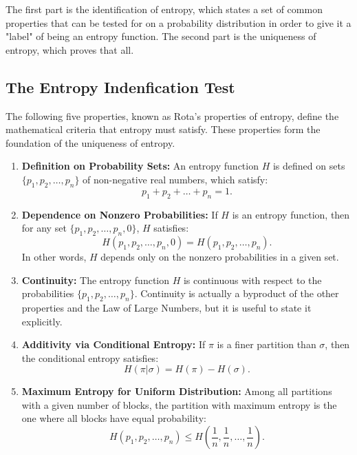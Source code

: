 \documentclass{report}
\begin{document}
The first part is the identification of entropy, which states a set of common properties that can be tested for on a probability distribution in order to give it a "label" of being an entropy function. The second part is the uniqueness of entropy, which proves that all.
\subsection*{The Entropy Indenfication Test}

The following five properties, known as Rota's properties of entropy, define the mathematical criteria that entropy must satisfy. These properties form the foundation of the uniqueness of entropy.

\begin{enumerate}
    \item \textbf{Definition on Probability Sets:}  
    An entropy function \( H \) is defined on sets \( \{p_1, p_2, \ldots, p_n\} \) of non-negative real numbers, which satisfy:
    \[
    p_1 + p_2 + \ldots + p_n = 1.
    \]

    \item \textbf{Dependence on Nonzero Probabilities:}  
    If \( H \) is an entropy function, then for any set \( \{p_1, p_2, \ldots, p_n, 0\} \), \( H \) satisfies:
    \[
    H(p_1, p_2, \ldots, p_n, 0) = H(p_1, p_2, \ldots, p_n).
    \]
    In other words, \( H \) depends only on the nonzero probabilities in a given set.

    \item \textbf{Continuity:}  
    The entropy function \( H \) is continuous with respect to the probabilities \( \{p_1, p_2, \ldots, p_n\} \). Continuity is actually a byproduct of the other properties and the Law of Large Numbers, but it is useful to state it explicitly.

    \item \textbf{Additivity via Conditional Entropy:}  
    If \( \pi \) is a finer partition than \( \sigma \), then the conditional entropy satisfies:
    \[
    H(\pi|\sigma) = H(\pi) - H(\sigma).
    \]

    \item \textbf{Maximum Entropy for Uniform Distribution:}  
    Among all partitions with a given number of blocks, the partition with maximum entropy is the one where all blocks have equal probability:
    \[
    H(p_1, p_2, \ldots, p_n) \leq H\left(\frac{1}{n}, \frac{1}{n}, \ldots, \frac{1}{n}\right).
    \]
\end{enumerate}
\end{document}
